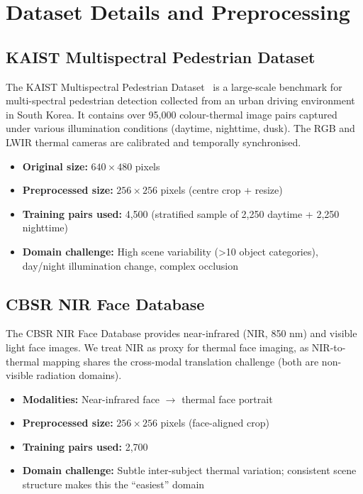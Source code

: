 \chapter{Dataset Details and Preprocessing}
\label{AppendixB}

\section{KAIST Multispectral Pedestrian Dataset}

The KAIST Multispectral Pedestrian Dataset~\cite{b_kaist} is a large-scale benchmark for multi-spectral pedestrian detection collected from an urban driving environment in South Korea. It contains over 95,000 colour-thermal image pairs captured under various illumination conditions (daytime, nighttime, dusk). The RGB and LWIR thermal cameras are calibrated and temporally synchronised.

\begin{itemize}
    \item \textbf{Original size:} $640 \times 480$ pixels
    \item \textbf{Preprocessed size:} $256 \times 256$ pixels (centre crop + resize)
    \item \textbf{Training pairs used:} 4,500 (stratified sample of 2,250 daytime + 2,250 nighttime)
    \item \textbf{Domain challenge:} High scene variability (>10 object categories), day/night illumination change, complex occlusion
\end{itemize}

\section{CBSR NIR Face Database}

The CBSR NIR Face Database provides near-infrared (NIR, 850 nm) and visible light face images. We treat NIR as proxy for thermal face imaging, as NIR-to-thermal mapping shares the cross-modal translation challenge (both are non-visible radiation domains).

\begin{itemize}
    \item \textbf{Modalities:} Near-infrared face $\to$ thermal face portrait
    \item \textbf{Preprocessed size:} $256 \times 256$ pixels (face-aligned crop)
    \item \textbf{Training pairs used:} 2,700
    \item \textbf{Domain challenge:} Subtle inter-subject thermal variation; consistent scene structure makes this the ``easiest'' domain
\end{itemize}

